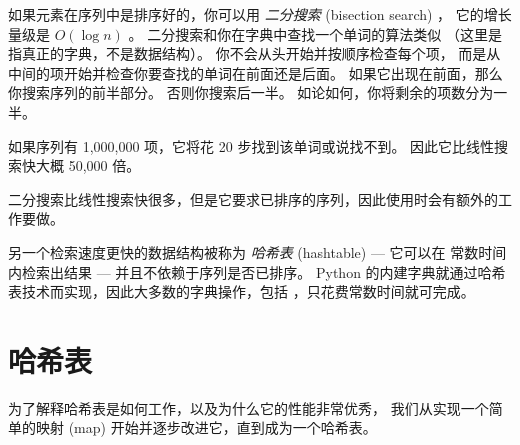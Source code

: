 如果元素在序列中是排序好的，你可以用 {\em 二分搜索} (bisection search) ，
它的增长量级是 $O(\log n)$ 。  二分搜索和你在字典中查找一个单词的算法类似
（这里是指真正的字典，不是数据结构）。 你不会从头开始并按顺序检查每个项，
而是从中间的项开始并检查你要查找的单词在前面还是后面。
如果它出现在前面，那么你搜索序列的前半部分。
否则你搜索后一半。 如论如何，你将剩余的项数分为一半。
  


如果序列有 1,000,000 项，它将花 20 步找到该单词或说找不到。
因此它比线性搜索快大概 50,000 倍。


二分搜索比线性搜索快很多，但是它要求已排序的序列，因此使用时会有额外的工作要做。


另一个检索速度更快的数据结构被称为 {\em 哈希表} (hashtable) --- 它可以在 常数时间 内检索出结果 --- 并且不依赖于序列是否已排序。 Python 的内建字典就通过哈希表技术而实现，因此大多数的字典操作，包括  ，只花费常数时间就可完成。


\section{哈希表}
\label{hashtable}


为了解释哈希表是如何工作，以及为什么它的性能非常优秀，
我们从实现一个简单的映射 (map) 开始并逐步改进它，直到成为一个哈希表。
  

